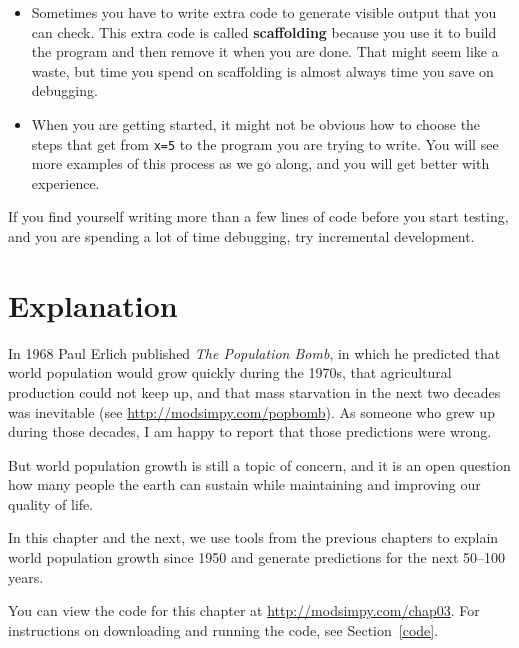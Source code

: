 \documentclass[12pt]{book}
\theoremstyle{exercise}
\begin{document}
\begin{itemize}

\item Sometimes you have to write extra code to generate visible output that you can check.  This extra code is called {\bf scaffolding} because you use it to build the program and then remove it when you are done.  That might seem like a waste, but time you spend on scaffolding is almost always time you save on debugging.

\item When you are getting started, it might not be obvious how to
choose the steps that get from {\tt x=5} to the program you are trying
to write.  You will see more examples of this process as we go along, and you will get better with experience.

\end{itemize}

If you find yourself writing more than a few lines of code before you start testing, and you are spending a lot of time debugging, try incremental development.


\chapter{Explanation}
\label{chap03}

In 1968 Paul Erlich published {\it The Population Bomb}, in which he predicted that world population would grow quickly during the 1970s, that agricultural production could not keep up, and that mass starvation in the next two decades was inevitable (see \url{http://modsimpy.com/popbomb}).  As someone who grew up during those decades, I am happy to report that those predictions were wrong.
  

But world population growth is still a topic of concern, and it is an open question how many people the earth can sustain while maintaining and improving our quality of life.


In this chapter and the next, we use tools from the previous chapters to explain world population growth since 1950 and generate predictions for the next 50--100 years.


You can view the code for this chapter at \url{http://modsimpy.com/chap03}.  For instructions on downloading and running the code, see Section~\ref{code}.
\end{document}
